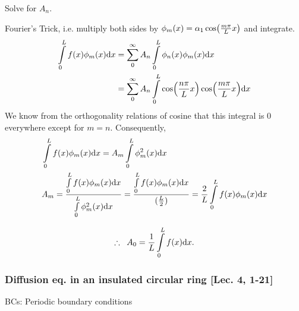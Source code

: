 \begin{quest}
	\item Solve for $A_n$.
	\begin{ans}
		Fourier's Trick, i.e. multiply both sides by $\phi_m(x) = \alpha_1 \cos(\frac{m\pi}{L} x)$ and integrate. 
		\[\begin{aligned}
			\int\limits_0^L f(x) \phi_m(x) \text{d} x
				&= \sum\limits_0^\infty A_n \int\limits_0^L \phi_n(x) \phi_m(x) \text{d} x \\
				&= \sum\limits_0^\infty A_n \int\limits_0^L \cos(\frac{n\pi}{L} x) \cos(\frac{m\pi}{L} x) \text{d} x
		\end{aligned}\]
		We know from the orthogonality relations of cosine that this integral is 0 everywhere except for $m = n$. Consequently, 
		\[\begin{aligned}
			&\int\limits_0^L f(x) \phi_m(x) \text{d} x = A_m \int\limits_0^L \phi^2_m(x) \text{d} x \\
			& A_m = 
				\frac{ \int\limits_0^L f(x) \phi_m(x) \text{d} x }{ \int\limits_0^L \phi^2_m(x) \text{d} x } = \frac{ \int\limits_0^L f(x) \phi_m(x) \text{d} x}{ (\frac{L}{2})  }
				= \frac{2}{L} \int\limits_0^L f(x) \phi_m(x) \text{d} x \\
		\end{aligned}\]
	\end{ans}

	\item 
\end{quest}
\begin{equation} 
	\therefore \;\; A_0 = \frac{1}{L} \int\limits_0^L f(x) \text{d} x .
\end{equation}



\subsubsection*{Diffusion eq. in an insulated circular ring [Lec. 4, 1-21]}


BCs: Periodic boundary conditions